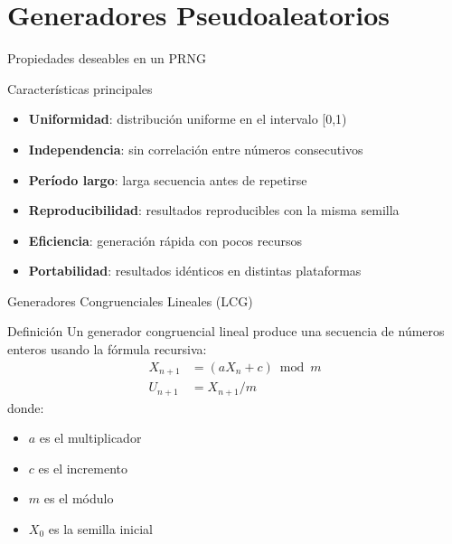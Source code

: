 \documentclass[aspectratio=169]{beamer}
\begin{document}
\section{Generadores Pseudoaleatorios}

\begin{frame}{Propiedades deseables en un PRNG}
    \begin{exampleblock}{Características principales}
        \begin{itemize}
            \item \textbf{Uniformidad}: distribución uniforme en el intervalo [0,1)
            \item \textbf{Independencia}: sin correlación entre números consecutivos
            \item \textbf{Período largo}: larga secuencia antes de repetirse
            \item \textbf{Reproducibilidad}: resultados reproducibles con la misma semilla
            \item \textbf{Eficiencia}: generación rápida con pocos recursos
            \item \textbf{Portabilidad}: resultados idénticos en distintas plataformas
        \end{itemize}
    \end{exampleblock}
\end{frame}

\begin{frame}{Generadores Congruenciales Lineales (LCG)}
    \begin{block}{Definición}
        Un generador congruencial lineal produce una secuencia de números enteros usando la fórmula recursiva:
        \begin{align}
        X_{n+1} &= (aX_n + c) \bmod m \\
        U_{n+1} &= X_{n+1}/m
        \end{align}
        donde:
        \begin{itemize}
            \item $a$ es el multiplicador
            \item $c$ es el incremento
            \item $m$ es el módulo
            \item $X_0$ es la semilla inicial
        \end{itemize}
    \end{block}
\end{frame}
\end{document}
